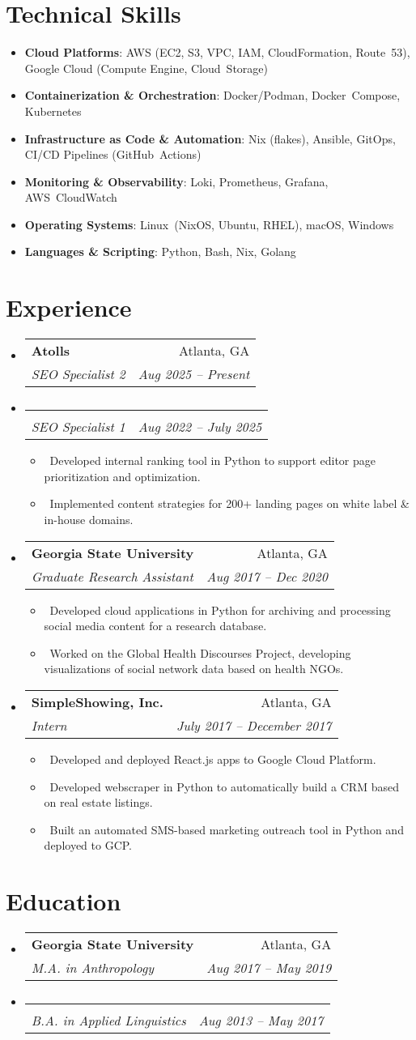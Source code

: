 \documentclass[letterpaper,10pt]{article}
\makeatletter
\newcommand{\resumeItem}[1]{
\item\small{#1}}
\newcommand{\resumeSubheading}[4]{
  \vspace{-1pt}
\item
  \begin{tabular*}{0.97\textwidth}[t]{l@{\extracolsep{\fill}}r}
    \textbf{#1} & #2 \\
    \textit{#3} & \textit{#4} \\
  \end{tabular*}\vspace{-7pt}
}
\newcommand{\resumeSubHeadingList}{
\begin{itemize}[leftmargin=0.15in, label={}]}
\newcommand{\resumeSubHeadingListEnd}{
  \end{itemize}}
\makeatother
\begin{document}
\section{Technical Skills}
\resumeSubHeadingList
\resumeItem{\textbf{Cloud Platforms}: AWS (EC2, S3, VPC, IAM,
CloudFormation, Route 53), Google Cloud (Compute Engine, Cloud Storage)}
\resumeItem{\textbf{Containerization \& Orchestration}:
Docker/Podman, Docker Compose, Kubernetes}
\resumeItem{\textbf{Infrastructure as Code \& Automation}: Nix
(flakes), Ansible, GitOps, CI/CD Pipelines (GitHub Actions)}
\resumeItem{\textbf{Monitoring \& Observability}: Loki, Prometheus,
Grafana, AWS CloudWatch}
\resumeItem{\textbf{Operating Systems}: Linux (NixOS, Ubuntu, RHEL),
macOS, Windows}
\resumeItem{\textbf{Languages \& Scripting}: Python, Bash, Nix, Golang}
\resumeSubHeadingListEnd


\section{Experience}
\resumeSubHeadingList
\resumeSubheading
{Atolls}{Atlanta, GA}
{SEO Specialist 2}{Aug 2025 -- Present}
\resumeSubheading
{}{}
{SEO Specialist 1}{Aug 2022 -- July 2025}
\resumeSubHeadingList
\resumeItem{\textbullet\ Developed internal ranking tool in Python to
support editor page prioritization and optimization.}
\resumeItem{\textbullet\ Implemented content strategies for 200+
landing pages on white label \& in-house domains.}
\resumeSubHeadingListEnd
\resumeSubheading
{Georgia State University}{Atlanta, GA}
{Graduate Research Assistant}{Aug 2017 -- Dec 2020}
\resumeSubHeadingList
\resumeItem{\textbullet\ Developed cloud applications in Python for
archiving and processing social media content for a research database.}
\resumeItem{\textbullet\ Worked on the Global Health Discourses
Project, developing visualizations of social network data based on health NGOs.}
\resumeSubHeadingListEnd
\resumeSubheading
{SimpleShowing, Inc.}{Atlanta, GA}
{Intern}{July 2017 -- December 2017}
\resumeSubHeadingList
\resumeItem{\textbullet\ Developed and deployed React.js apps to
Google Cloud Platform.}
\resumeItem{\textbullet\ Developed webscraper in Python to
automatically build a CRM based on real estate listings.}
\resumeItem{\textbullet\ Built an automated SMS-based marketing
outreach tool in Python and deployed to GCP.}
\resumeSubHeadingListEnd
\resumeSubHeadingListEnd

\section{Education}
\resumeSubHeadingList
\resumeSubheading
{Georgia State University}{Atlanta, GA}
{M.A. in Anthropology}{Aug 2017 -- May 2019}
\resumeSubheading
{}{}
{B.A. in Applied Linguistics}{Aug 2013 -- May 2017}
\resumeSubHeadingListEnd
\end{document}
